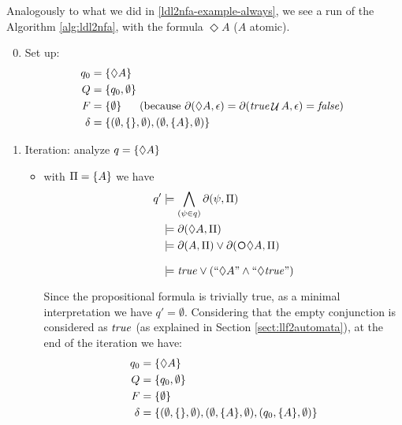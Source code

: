 \begin{example}\label{ldl2nfa-example-eventually}
	Analogously to what we did in \ref{ldl2nfa-example-always}, we see a run of the Algorithm \ref{alg:ldl2nfa}, with the \LTLf formula $\Diamond A$ ($A$ atomic).
	\begin{enumerate}
		\setcounter{enumi}{-1}
		\item Set up:
		\begin{align*}
		q_0 &= \{\Diamond A\}		\\
		Q &= \{q_0, \emptyset\}  \\
		F &= \{\emptyset\}  \hspace*{.18in} \ \text{(because $\partial\lparen \Diamond A, \epsilon\rparen= \partial\lparen \mathit{true} \mathop{\mathcal{U}} A, \epsilon\rparen = \mathit{false}$)}\ \\
		\delta &= \{(\emptyset, \{\}, \emptyset), (\emptyset, \{A\}, \emptyset)\}
		\end{align*}
		\item \label{exa:eventually-A_it-1} Iteration: analyze $q = \{\Diamond A\}$
		\begin{itemize}
			\item \label{exa:eventually-A_it-1_prop-A} with $\Pi = \{A\}$ we have 
			\begin{align*}
			q' &\models \bigwedge_{(\psi\in q)} \Dfun{\psi}\\
			&\models \Dfun{\Diamond A}\\
			&\models \Dfun{A} \lOR \Dfun{\Next \Diamond A}\\
			&\models \true \lOR (``\Diamond A" \lAND ``\Diamond \true")
			\end{align*}
			Since the propositional formula is trivially true, as a minimal interpretation we have $q' = \emptyset$.
			Considering that the empty conjunction is considered as $\mathit{true}$ (as explained in Section \ref{sect:llf2automata}), at the end of the iteration we have:
			\begin{align*}
			q_0 &= \{\Diamond A\}		\\
			Q &= \{q_0, \emptyset\}  \\
			F &= \{\emptyset\}  \\
			\delta &= \{(\emptyset, \{\}, \emptyset), (\emptyset, \{A\}, \emptyset), (q_0, \{A\}, \emptyset)\}
			\end{align*}
			

\end{itemize}
\end{enumerate}
\end{example}
